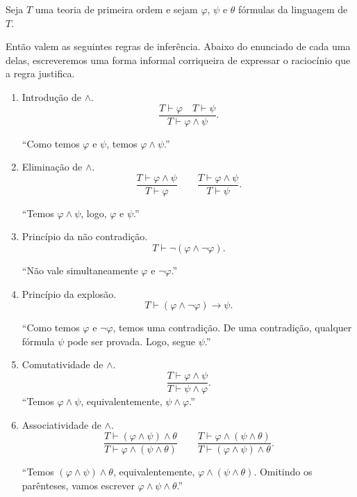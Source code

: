 \begin{metaproposition}\label{mprop:regrasProposicionaisConjuncao}\label{mprop:principioDaExplosao}
    Seja $T$ uma teoria de primeira ordem e sejam $\varphi$, $\psi$ e $\theta$ fórmulas da linguagem de $T$.

    Então valem as seguintes regras de inferência.
    Abaixo do enunciado de cada uma delas, escreveremos uma forma informal corriqueira de expressar o raciocínio que a regra justifica.
    \begin{enumerate}[label=(\roman*)]

        \item Introdução de $\land$.
        \[
            \frac{T\vdash \varphi \quad T\vdash \psi}
                 {T\vdash \varphi\land\psi}.
        \]

        ``Como temos $\varphi$ e $\psi$, temos $\varphi\land\psi$.''

        \item Eliminação de $\land$.
        \[
            \frac{T\vdash \varphi\land\psi}
                 {T\vdash \varphi}
            \qquad
            \frac{T\vdash \varphi\land\psi}
                 {T\vdash \psi}.
        \]

        ``Temos $\varphi\land\psi$, logo, $\varphi$ e $\psi$.''

        \item Princípio da não contradição.
        \[
            T\vdash \neg(\varphi\land\neg\varphi).
        \]

        ``Não vale simultaneamente $\varphi$ e $\neg\varphi$.''

        \item Princípio da explosão.
        \[
            T\vdash (\varphi\land\neg\varphi)\rightarrow\psi.
        \]

        ``Como temos $\varphi$ e $\neg\varphi$, temos uma contradição.
        De uma contradição, qualquer fórmula $\psi$ pode ser provada.
        Logo, segue $\psi$.''

        \item Comutatividade de $\land$.
        \[
            \frac{T\vdash \varphi\land\psi}
                 {T\vdash \psi\land\varphi}.
        \]
        ``Temos $\varphi\land\psi$, equivalentemente, $\psi\land\varphi$.''

        \item Associatividade de $\land$.
        \[
            \frac{T\vdash (\varphi\land\psi)\land\theta}
                 {T\vdash \varphi\land(\psi\land\theta)}
            \qquad
            \frac{T\vdash \varphi\land(\psi\land\theta)}
                 {T\vdash (\varphi\land\psi)\land\theta}.
        \]

        ``Temos $(\varphi\land\psi)\land\theta$, equivalentemente, $\varphi\land(\psi\land\theta)$.
        Omitindo os parênteses, vamos escrever $\varphi\land\psi\land\theta$.''
    \end{enumerate}
\end{metaproposition}

